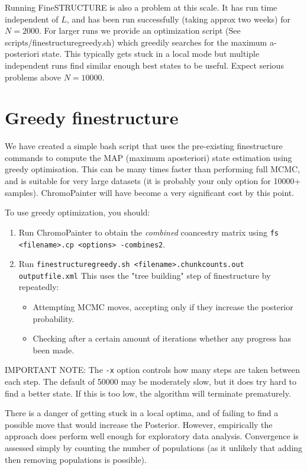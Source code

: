 \documentclass[11pt]{article}
\begin{document}
Running FineSTRUCTURE is also a problem at this scale. It has run time independent of $L$, and has been run successfully (taking approx two weeks) for $N=2000$.  For larger runs we provide an optimization script (See scripts/finestructuregreedy.sh) which greedily searches for the maximum a-posteriori state. This typically gets stuck in a local mode but multiple independent runs find similar enough best states to be useful. Expect serious problems above $N=10000$.

\section{Greedy finestructure}
We have created a simple bash script that uses the pre-existing finestructure commands to compute the MAP (maximum aposteriori) state estimation using greedy optimisation. This can be many times faster than performing full MCMC, and is suitable for very large datasets (it is probably your only option for 10000+ samples). ChromoPainter will have become a very significant cost by this point.

To use greedy optimization, you should:
\begin{enumerate}
\item Run ChromoPainter to obtain the \emph{combined} coancestry matrix using \verb!fs <filename>.cp <options> -combines2!.
\item Run \verb!finestructuregreedy.sh <filename>.chunkcounts.out outputfile.xml! This uses the "tree building" step of finestructure by repeatedly:
  \begin{itemize}
    \item Attempting MCMC moves, accepting only if they increase the posterior probability.
    \item Checking after a certain amount of iterations whether any progress has been made.
  \end{itemize}
\end{enumerate}

IMPORTANT NOTE: The \verb!-x! option controls how many steps are taken between each step. The default of 50000 may be moderately slow, but it does try hard to find a better state. If this is too low, the algorithm will terminate prematurely.

There is a danger of getting stuck in a local optima, and of failing to find a possible move that would increase the Posterior. However, empirically the approach does perform well enough for exploratory data analysis. Convergence is assessed simply by counting the number of populations (as it unlikely that adding then removing populations is possible).
\end{document}
